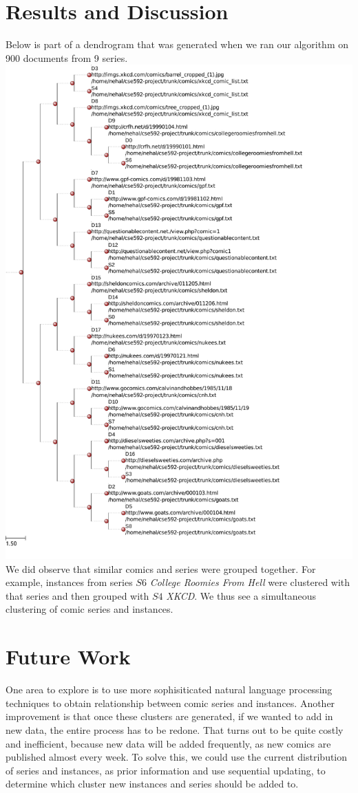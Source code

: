 \documentclass[11pt,twocolumn]{article}
\begin{document}
\section{Results and Discussion}
Below is part of a dendrogram that was generated when we ran our algorithm on 900 documents from 9 series.
\includegraphics[height=\textheight]{demo1.pdf}
We did observe that similar comics and series were grouped together. For example, instances from series $S6$ \emph{College Roomies From Hell} were clustered with that series and then grouped with $S4$ \emph{XKCD}. We thus see a simultaneous clustering of comic series and instances.

\section{Future Work}
One area to explore is to use more sophisiticated natural language processing techniques to obtain relationship between comic series and instances. Another improvement is that once these clusters are generated, if we wanted to add in new data, the entire process has to be redone. That turns out to be quite costly and inefficient, because new data will be added frequently, as new comics are published almost every week. To solve this, we could use the current distribution of series and instances, as prior information and use sequential updating,  to determine which cluster new instances and series should be added to.
\end{document}
